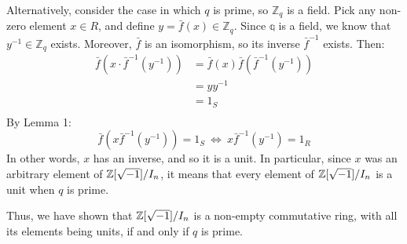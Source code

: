 \documentclass{exam}
\begin{document}
\begin{questions}
\smallskip

Alternatively, consider the case in which $q$ is prime, so $\mathbb{Z}_q$ is a field. Pick any non-zero element $x \in R$, and define $y = \bar{f}(x) \in \mathbb{Z}_q$. Since $\mathbb{q}$ is a field, we know that $y^{-1} \in \mathbb{Z}_q$ exists. Moreover, $\bar{f}$ is an isomorphism, so its inverse $\bar{f}^{-1}$ exists. Then:
\begin{align*}
    \bar{f}(x \cdot \bar{f}^{-1}(y^{-1})) &= \bar{f}(x)\bar{f}(\bar{f}^{-1}(y^{-1})) \\
                                   &= yy^{-1} \\
                                   &= 1_S \\
\end{align*}
By Lemma 1:
\[
\bar{f}(x\bar{f}^{-1}(y^{-1})) = 1_S \ \iff \ x\bar{f}^{-1}(y^{-1}) = 1_R
\]
In other words, $x$ has an inverse, and so it is a unit. In particular, since $x$ was an arbitrary element of $\mathbb{Z}[\sqrt{-1}]/I_n$, it means that every element of $\mathbb{Z}[\sqrt{-1}]/I_n$ is a unit when $q$ is prime.

\smallskip

Thus, we have shown that $\mathbb{Z}[\sqrt{-1}]/I_n$ is a non-empty commutative ring, with all its elements being units, if and only if $q$ is prime.



\end{questions}
\end{document}
